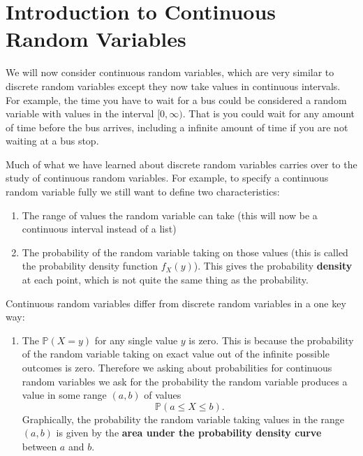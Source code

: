\documentclass[
]{book}
\providecommand{\tightlist}{%
  \setlength{\itemsep}{0pt}\setlength{\parskip}{0pt}}
\theoremstyle{definition}
\theoremstyle{definition}
\theoremstyle{definition}
\theoremstyle{definition}
\theoremstyle{remark}
\begin{document}
\hypertarget{introduction-to-continuous-random-variables}{%
\section{Introduction to Continuous Random Variables}\label{introduction-to-continuous-random-variables}}

We will now consider continuous random variables, which are very similar to discrete random variables except they now take values in continuous intervals. For example, the time you have to wait for a bus could be considered a random variable with values in the interval \([0, \infty)\). That is you could wait for any amount of time before the bus arrives, including a infinite amount of time if you are not waiting at a bus stop.

Much of what we have learned about discrete random variables carries over to the study of continuous random variables. For example, to specify a continuous random variable fully we still want to define two characteristics:

\begin{enumerate}
\def\labelenumi{\arabic{enumi}.}
\tightlist
\item
  The range of values the random variable can take (this will now be a continuous interval instead of a list)
\item
  The probability of the random variable taking on those values (this is called the probability density function \(f_X(y)\)). This gives the probability \textbf{density} at each point, which is not quite the same thing as the probability.
\end{enumerate}

Continuous random variables differ from discrete random variables in a one key way:

\begin{enumerate}
\def\labelenumi{\arabic{enumi}.}
\tightlist
\item
  The \(\mathbb{P}(X=y)\) for any single value \(y\) is zero. This is because the probability of the random variable taking on exact value out of the infinite possible outcomes is zero. Therefore we asking about probabilities for continuous random variables we ask for the probability the random variable produces a value in some range \((a,b)\) of values \[\mathbb{P}(a\leq X \leq b).\] Graphically, the probability the random variable taking values in the range \((a,b)\) is given by the \textbf{area under the probability density curve} between \(a\) and \(b\).
\end{enumerate}
\end{document}
